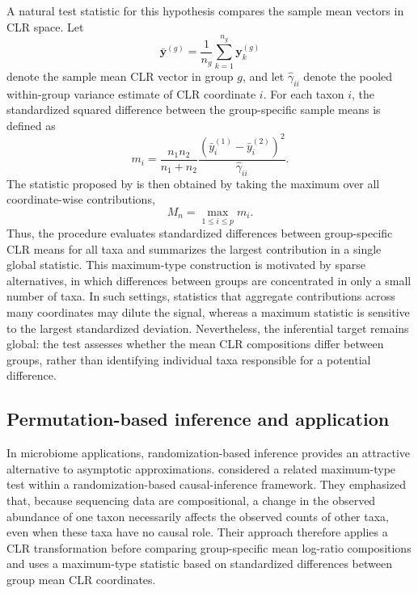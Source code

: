 A natural test statistic for this hypothesis compares the sample mean vectors in CLR space. Let
\begin{equation}
	\bar{\mathbf{y}}^{(g)} = 
	\frac{1}{n_g}
	\sum_{k=1}^{n_g}
	\mathbf{y}_k^{(g)}
\end{equation}
denote the sample mean CLR vector in group $g$, and let $\hat{\gamma}_{ii}$ denote the pooled within-group variance estimate of CLR coordinate $i$. For each taxon $i$, the standardized squared difference between the group-specific sample means is defined as
\begin{equation}
	m_i = \frac{n_1n_2}{n_1+n_2} \frac{\left(\bar{y}_i^{(1)}-\bar{y}_i^{(2)}\right)^2}
	{\hat{\gamma}_{ii}}.
	\label{eq:3community:comp_equivalence:coordinate_contribution}
\end{equation}
The statistic proposed by \citet{cao2018twosample} is then obtained by taking the maximum over all coordinate-wise contributions,
\begin{equation}
	M_n = \max_{1\leq i\leq p} m_i.
	\label{eq:3community:comp_equivalence:maximum_statistic}
\end{equation}
Thus, the procedure evaluates standardized differences between group-specific CLR means for all taxa and summarizes the largest contribution in a single global statistic. This maximum-type construction is motivated by sparse alternatives, in which differences between groups are concentrated in only a small number of taxa. In such settings, statistics that aggregate contributions across many coordinates may dilute the signal, whereas a maximum statistic is sensitive to the largest standardized deviation. Nevertheless, the inferential target remains global: the test assesses whether the mean CLR compositions differ between groups, rather than identifying individual taxa responsible for a potential difference.


\subsection{Permutation-based inference and application}
\label{sec:3community:comp_equivalence:permutation}

In microbiome applications, randomization-based inference provides an attractive alternative to asymptotic approximations. \citet{sommer2022randomizationbased} considered a related maximum-type test within a randomization-based causal-inference framework. They emphasized that, because sequencing data are compositional, a change in the observed abundance of one taxon necessarily affects the observed counts of other taxa, even when these taxa have no causal role. Their approach therefore applies a CLR transformation before comparing group-specific mean log-ratio compositions and uses a maximum-type statistic based on standardized differences between group mean CLR coordinates.

